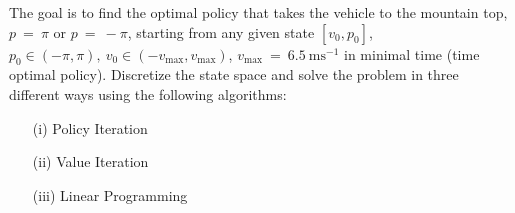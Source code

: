 \documentclass[uebung]{ETHIDSCprogramming_dpoc}
\begin{document}
The goal is to find the optimal policy that takes the vehicle to the mountain top, $p~=~\pi $ or  $p~=~-\pi $, starting from any given state $[v_0,p_0]$,  $p_0 \in (-\pi,\pi),\ v_0 \in (-v_\mathrm{max},v_\mathrm{max})$, $v_\mathrm{max}~=~6.5~\mathrm{ms}^{-1}$ in minimal time (time optimal policy). 
Discretize the state space and solve the problem in three different ways using the following algorithms:


\begin{itemize}
	\item[(i)] Policy Iteration
	\item[(ii)] Value Iteration
	\item[(iii)] Linear Programming
\end{itemize}
\end{document}
